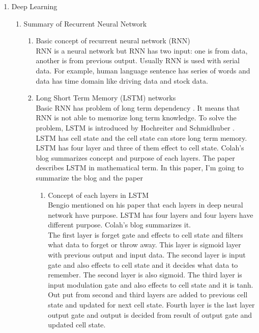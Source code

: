 \documentclass[12pt]{article}
\begin{document}
\begin{enumerate}
\item Deep Learning
	\begin{enumerate}
	\item Summary of Recurrent Neural Network
		\begin{enumerate}
		\item Basic concept of recurrent neural network (RNN)\\
			RNN is a neural network but RNN has two input: one is from data, another is from previous output. Usually RNN is used with serial data. For example, human language sentence has series of words and data has time domain like driving data and stock data.
		\item Long Short Term Memory (LSTM) networks\\
			Basic RNN has problem of long term dependency \cite{UnderstandingLSTMNetworks}. It means that RNN is not able to memorize long term knowledge. To solve the problem, LSTM is introduced by Hochreiter and Schmidhuber \cite{hochreiter1997long}. LSTM has cell state and the cell state can store long term memory. LSTM has four layer and three of them effect to cell state. Colah's blog \cite{UnderstandingLSTMNetworks} summarizes concept and purpose of each layers. The paper \cite{zaremba2014recurrent} describes LSTM in mathematical term. In this paper, I'm going to summarize the blog \cite{UnderstandingLSTMNetworks} and the paper \cite{zaremba2014recurrent}
			\begin{enumerate}
			\item Concept of each layers in LSTM\\
				Bengio mentioned on his paper \cite{bengio2009learning} that each layers in deep neural network have purpose. LSTM has four layers and four layers have different purpose. Colah's blog \cite{UnderstandingLSTMNetworks} summarizes it.\\
				The first layer is forget gate and effects to cell state and filters what data to forget or throw away. This layer is sigmoid layer with previous output and input data. The second layer is input gate and also effects to cell state and it decides what data to remember. The second layer is also sigmoid. The third layer is input modulation gate and also effects to cell state and it is tanh. Out put from second and third layers are added to previous cell state and updated for next cell state. Fourth layer is the last layer output gate and output is decided from result of output gate and updated cell state.
				

\end{enumerate}
\end{enumerate}
\end{enumerate}
\end{enumerate}
\end{document}
